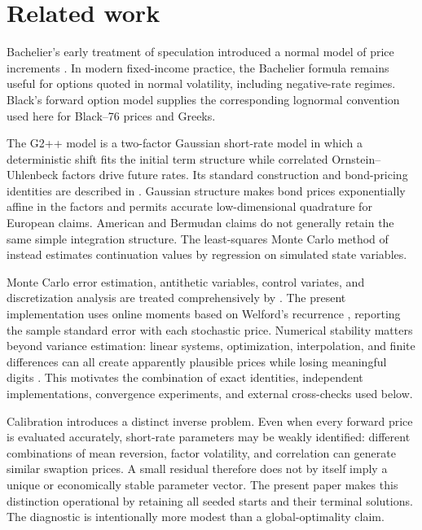 \documentclass[11pt]{article}
\numberwithin{equation}{section}
\theoremstyle{definition}
\theoremstyle{remark}
\begin{document}
\section{Related work}

Bachelier's early treatment of speculation introduced a normal model of price
increments \citep{bachelier1900}. In modern fixed-income practice, the Bachelier
formula remains useful for options quoted in normal volatility, including
negative-rate regimes. Black's forward option model \citep{black1976} supplies
the corresponding lognormal convention used here for Black--76 prices and
Greeks.

The G2++ model is a two-factor Gaussian short-rate model in which a deterministic
shift fits the initial term structure while correlated Ornstein--Uhlenbeck
factors drive future rates. Its standard construction and bond-pricing
identities are described in \citet{brigo2006}. Gaussian structure makes bond
prices exponentially affine in the factors and permits accurate low-dimensional
quadrature for European claims. American and Bermudan claims do not generally
retain the same simple integration structure. The least-squares Monte Carlo
method of \citet{longstaff2001} instead estimates continuation values by
regression on simulated state variables.

Monte Carlo error estimation, antithetic variables, control variates, and
discretization analysis are treated comprehensively by \citet{glasserman2003}.
The present implementation uses online moments based on Welford's recurrence
\citep{welford1962}, reporting the sample standard error with each stochastic
price. Numerical stability matters beyond variance estimation: linear systems,
optimization, interpolation, and finite differences can all create apparently
plausible prices while losing meaningful digits \citep{higham2002}. This
motivates the combination of exact identities, independent implementations,
convergence experiments, and external cross-checks used below.

Calibration introduces a distinct inverse problem. Even when every forward
price is evaluated accurately, short-rate parameters may be weakly identified:
different combinations of mean reversion, factor volatility, and correlation
can generate similar swaption prices. A small residual therefore does not by
itself imply a unique or economically stable parameter vector. The present
paper makes this distinction operational by retaining all seeded starts and
their terminal solutions. The diagnostic is intentionally more modest than a
global-optimality claim.
\end{document}
